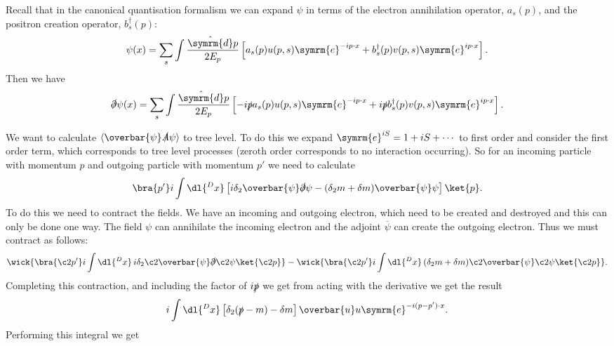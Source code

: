 \documentclass[fleqn]{NotesClass}
\newcommand{\e}{\symrm{e}}
\newcommand{\diracadjoint}[1]{\overbar{#1}}
\newcommand{\hermit}{\dagger}
\DeclarePairedDelimiter{\correlator}{\langle}{\rangle}
\newcommand{\dhat}[1]{\hat{\symrm{d}}{#1}}
\begin{document}
    Recall that in the canonical quantisation formalism we can expand \(\psi\) in terms of the electron annihilation operator, \(a_s(p)\), and the positron creation operator, \(b_s^\hermit(p)\):
    \begin{equation}
        \psi(x) = \sum_s \int \frac{\dhat{p}}{2E_p} \left[ a_s(p) u(p, s) \e^{-ip \cdot x} + b_s^\hermit(p) v(p, s) \e^{ip\cdot x} \right].
    \end{equation}
    Then we have
    \begin{equation}
        \slashed{\partial}\psi(x) = \sum_s \int \frac{\dhat{p}}{2E_p} \left[ -i\slashed{p} a_s(p) u(p, s) \e^{-ip \cdot x} + i \slashed{p} b_s^\hermit(p) v(p, s) \e^{ip\cdot x} \right].
    \end{equation}
    
    We want to calculate \(\correlator{\diracadjoint{\psi}\slashed{A}\psi}\) to tree level.
    To do this we expand \(\e^{iS} = 1 + iS + \dotsb\) to first order and consider the first order term, which corresponds to tree level processes (zeroth order corresponds to no interaction occurring).
    So for an incoming particle with momentum \(p\) and outgoing particle with momentum \(p'\) we need to calculate
    \begin{equation}
        \bra{p'} i \int \dl{^Dx} \left[ i \delta_2 \diracadjoint{\psi}\slashed{\partial}\psi - (\delta_2 m + \delta m) \diracadjoint{\psi}\psi \right] \ket{p}.
    \end{equation}
    To do this we need to contract the fields.
    We have an incoming and outgoing electron, which need to be created and destroyed and this can only be done one way.
    The field \(\psi\) can annihilate the incoming electron and the adjoint \(\diracadjoint{\psi}\) can create the outgoing electron.
    Thus we must contract as follows:
    \begin{equation}
        \wick{\bra{\c2{p}'} i \int \dl{^Dx} \, i\delta_2\c2{\diracadjoint{\psi}}\slashed{\partial}\c2{\psi} \ket{\c2{p}}} - \wick{\bra{\c2{p}'} i \int \dl{^Dx} \, (\delta_2 m + \delta m) \c2{\diracadjoint{\psi}}\c2{\psi} \ket{\c2{p}}}.
    \end{equation}
    Completing this contraction, and including the factor of \(i\slashed{p}\) we get from acting with the derivative we get the result
    \begin{equation}
        i \int \dl{^D x} \left[ \delta_2 (\slashed{p} - m) - \delta m \right] \diracadjoint{u}u \e^{-i(p - p') \cdot x}.
    \end{equation}
    Performing this integral we get
\end{document}
